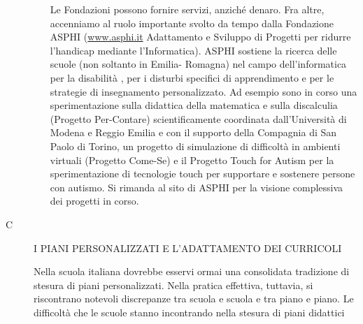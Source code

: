 \begin{description}
\begin{enumerate}
			Le Fondazioni possono fornire servizi, anziché denaro. Fra altre, accenniamo al ruolo importante svolto
			da tempo dalla Fondazione ASPHI (\url{www.asphi.it} Adattamento e Sviluppo di Progetti per ridurre
			l'handicap mediante l'Informatica). ASPHI sostiene la ricerca delle scuole (non soltanto in Emilia-
			Romagna) nel campo dell'informatica per la disabilità , per i disturbi specifici di apprendimento e per
			le strategie di insegnamento personalizzato. Ad esempio sono in corso una sperimentazione sulla
			didattica della matematica e sulla discalculia (Progetto Per-Contare) scientificamente coordinata
			dall'Università di Modena e Reggio Emilia e con il supporto della Compagnia di San Paolo di Torino, un
			progetto di simulazione di difficoltà in ambienti virtuali (Progetto Come-Se) e il Progetto Touch for
			Autism per la sperimentazione di tecnologie touch per supportare e sostenere persone con autismo.
			Si rimanda al sito di ASPHI per la visione complessiva dei progetti in corso.
	\end{enumerate}
	\item [C] I PIANI PERSONALIZZATI E L'ADATTAMENTO DEI CURRICOLI
	
	Nella scuola italiana dovrebbe esservi ormai una consolidata tradizione di stesura di piani
	personalizzati. Nella pratica effettiva, tuttavia, si riscontrano notevoli discrepanze tra scuola e scuola
	e tra piano e piano. Le difficoltà che le scuole stanno incontrando nella stesura di piani didattici
	

\end{description}
